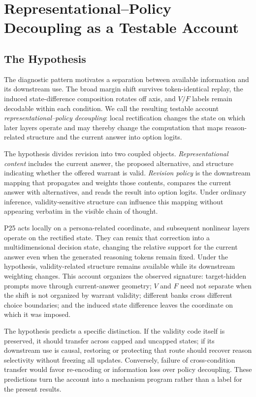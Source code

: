 \documentclass[letterpaper]{article} %
\begin{document}
\section{Representational--Policy Decoupling as a Testable Account}
\label{sec:implications}

\subsection{The Hypothesis}

The diagnostic pattern motivates a separation between available information and its downstream use. The broad margin shift survives token-identical replay, the induced state-difference composition rotates off axis, and $V/F$ labels remain decodable within each condition. We call the resulting testable account \emph{representational--policy decoupling}: local rectification changes the state on which later layers operate and may thereby change the computation that maps reason-related structure and the current answer into option logits.

The hypothesis divides revision into two coupled objects. \emph{Representational content} includes the current answer, the proposed alternative, and structure indicating whether the offered warrant is valid. \emph{Revision policy} is the downstream mapping that propagates and weights those contents, compares the current answer with alternatives, and reads the result into option logits. Under ordinary inference, validity-sensitive structure can influence this mapping without appearing verbatim in the visible chain of thought.

P25 acts locally on a persona-related coordinate, and subsequent nonlinear layers operate on the rectified state. They can remix that correction into a multidimensional decision state, changing the relative support for the current answer even when the generated reasoning tokens remain fixed. Under the hypothesis, validity-related structure remains available while its downstream weighting changes. This account organizes the observed signature: target-hidden prompts move through current-answer geometry; $V$ and $F$ need not separate when the shift is not organized by warrant validity; different banks cross different choice boundaries; and the induced state difference leaves the coordinate on which it was imposed.

The hypothesis predicts a specific distinction. If the validity code itself is preserved, it should transfer across capped and uncapped states; if its downstream use is causal, restoring or protecting that route should recover reason selectivity without freezing all updates. Conversely, failure of cross-condition transfer would favor re-encoding or information loss over policy decoupling. These predictions turn the account into a mechanism program rather than a label for the present results.
\end{document}
